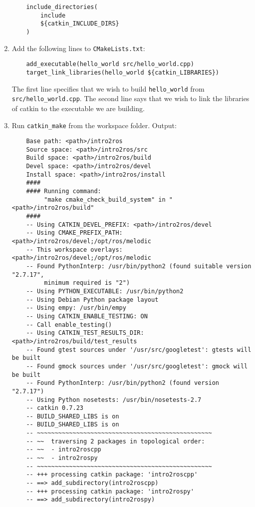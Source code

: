 \documentclass{article}
\begin{document}
\begin{enumerate}
\begin{verbatim}
    include_directories(
        include
        ${catkin_INCLUDE_DIRS}
    )
            \end{verbatim}
            \item Add the following lines to \texttt{CMakeLists.txt}:
            \begin{verbatim}
    add_executable(hello_world src/hello_world.cpp)
    target_link_libraries(hello_world ${catkin_LIBRARIES})
            \end{verbatim}
            The first line specifies that we wish to build \texttt{hello\_world}
            from \texttt{src/hello\_world.cpp}. The second line says that we wish 
            to link the libraries of catkin to the executable we are building.
            \item Run \texttt{catkin\_make} from the workspace folder. Output:
            \begin{verbatim}
    Base path: <path>/intro2ros
    Source space: <path>/intro2ros/src
    Build space: <path>/intro2ros/build
    Devel space: <path>/intro2ros/devel
    Install space: <path>/intro2ros/install
    ####
    #### Running command:
         "make cmake_check_build_system" in "<path>/intro2ros/build"
    ####
    -- Using CATKIN_DEVEL_PREFIX: <path>/intro2ros/devel
    -- Using CMAKE_PREFIX_PATH: <path>/intro2ros/devel;/opt/ros/melodic
    -- This workspace overlays: <path>/intro2ros/devel;/opt/ros/melodic
    -- Found PythonInterp: /usr/bin/python2 (found suitable version "2.7.17",
         minimum required is "2") 
    -- Using PYTHON_EXECUTABLE: /usr/bin/python2
    -- Using Debian Python package layout
    -- Using empy: /usr/bin/empy
    -- Using CATKIN_ENABLE_TESTING: ON
    -- Call enable_testing()
    -- Using CATKIN_TEST_RESULTS_DIR: <path>/intro2ros/build/test_results
    -- Found gtest sources under '/usr/src/googletest': gtests will be built
    -- Found gmock sources under '/usr/src/googletest': gmock will be built
    -- Found PythonInterp: /usr/bin/python2 (found version "2.7.17") 
    -- Using Python nosetests: /usr/bin/nosetests-2.7
    -- catkin 0.7.23
    -- BUILD_SHARED_LIBS is on
    -- BUILD_SHARED_LIBS is on
    -- ~~~~~~~~~~~~~~~~~~~~~~~~~~~~~~~~~~~~~~~~~~~~~~~~~
    -- ~~  traversing 2 packages in topological order:
    -- ~~  - intro2roscpp
    -- ~~  - intro2rospy
    -- ~~~~~~~~~~~~~~~~~~~~~~~~~~~~~~~~~~~~~~~~~~~~~~~~~
    -- +++ processing catkin package: 'intro2roscpp'
    -- ==> add_subdirectory(intro2roscpp)
    -- +++ processing catkin package: 'intro2rospy'
    -- ==> add_subdirectory(intro2rospy)

\end{verbatim}
\end{enumerate}
\end{document}
